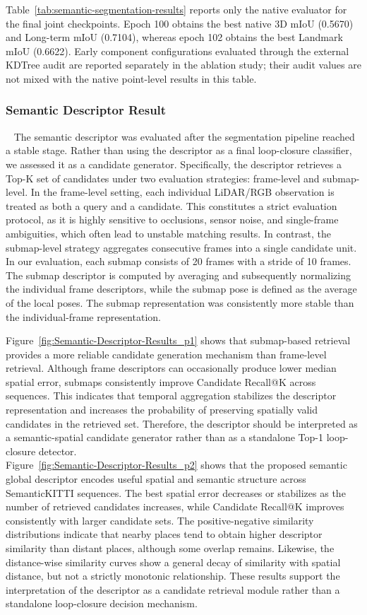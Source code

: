 Table~\ref{tab:semantic-segmentation-results} reports only the native evaluator for the final joint checkpoints. Epoch 100 obtains the best native 3D mIoU (0.5670) and Long-term mIoU (0.7104), whereas epoch 102 obtains the best Landmark mIoU (0.6622). Early component configurations evaluated through the external KDTree audit are reported separately in the ablation study; their audit values are not mixed with the native point-level results in this table.

\subsubsection{Semantic Descriptor Result}~\label{subsubsec:semantic-descriptor-result}
The semantic descriptor was evaluated after the segmentation pipeline reached a stable stage. Rather than using the descriptor as a final loop-closure classifier, we assessed it as a candidate generator. Specifically, the descriptor retrieves a Top-K set of candidates under two evaluation strategies: frame-level and submap-level.
In the frame-level setting, each individual LiDAR/RGB observation is treated as both a query and a candidate. This constitutes a strict evaluation protocol, as it is highly sensitive to occlusions, sensor noise, and single-frame ambiguities, which often lead to unstable matching results.
In contrast, the submap-level strategy aggregates consecutive frames into a single candidate unit. In our evaluation, each submap consists of 20 frames with a stride of 10 frames. The submap descriptor is computed by averaging and subsequently normalizing the individual frame descriptors, while the submap pose is defined as the average of the local poses. The submap representation was consistently more stable than the individual-frame representation.

Figure~\ref{fig:Semantic-Descriptor-Results_p1} shows that submap-based retrieval provides a more reliable candidate generation mechanism than frame-level retrieval. Although frame descriptors can occasionally produce lower median spatial error, submaps consistently improve Candidate Recall@K across sequences. This indicates that temporal aggregation stabilizes the descriptor representation and increases the probability of preserving spatially valid candidates in the retrieved set. Therefore, the descriptor should be interpreted as a semantic-spatial candidate generator rather than as a standalone Top-1 loop-closure detector. \\
Figure~\ref{fig:Semantic-Descriptor-Results_p2} shows that the proposed semantic global descriptor encodes useful spatial and semantic structure across SemanticKITTI sequences. The best spatial error decreases or stabilizes as the number of retrieved candidates increases, while Candidate Recall@K improves consistently with larger candidate sets. The positive-negative similarity distributions indicate that nearby places tend to obtain higher descriptor similarity than distant places, although some overlap remains. Likewise, the distance-wise similarity curves show a general decay of similarity with spatial distance, but not a strictly monotonic relationship. These results support the interpretation of the descriptor as a candidate retrieval module rather than a standalone loop-closure decision mechanism. 

